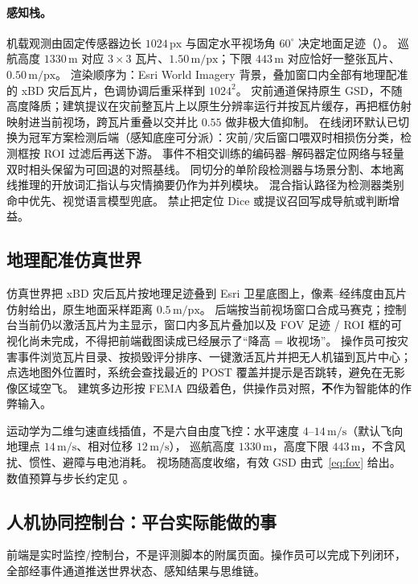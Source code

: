 \paragraph{感知栈。}
机载观测由固定传感器边长 $1024\,\mathrm{px}$ 与固定水平视场角 $60^\circ$ 决定地面足迹（）。
巡航高度 $1330\,\mathrm{m}$ 对应 $3\times3$ 瓦片、$1.50\,\mathrm{m/px}$；下限 $443\,\mathrm{m}$ 对应恰好一整张瓦片、$0.50\,\mathrm{m/px}$。
渲染顺序为：Esri World Imagery 背景，叠加窗口内全部有地理配准的 xBD 灾后瓦片，色调协调后重采样到 $1024^2$。
灾前通道保持原生 GSD，不随高度降质；建筑提议在灾前整瓦片上以原生分辨率运行并按瓦片缓存，再把框仿射映射进当前视场，跨瓦片重叠以交并比 $0.55$ 做非极大值抑制。
在线闭环默认已切换为冠军方案检测后端（感知底座可分派）：灾前/灾后窗口喂双时相损伤分类，检测框按 ROI 过滤后再送下游。
事件不相交训练的编码器--解码器定位网络与轻量双时相头保留为可回退的对照基线。
同切分的单阶段检测器与场景分割、本地离线推理的开放词汇指认与灾情摘要仍作为并列模块。
混合指认路径为检测器类别命中优先、视觉语言模型兜底。
禁止把定位 Dice 或提议召回写成导航或判断增益。

\subsection{地理配准仿真世界}
仿真世界把 xBD 灾后瓦片按地理足迹叠到 Esri 卫星底图上，像素--经纬度由瓦片仿射给出，原生地面采样距离 $0.5\,\mathrm{m/px}$。
后端按当前视场窗口合成马赛克；控制台当前仍以激活瓦片为主显示，窗口内多瓦片叠加以及 FOV 足迹 / ROI 框的可视化尚未完成，不得把前端截图读成已经展示了``降高 = 收视场''。
操作员可按灾害事件浏览瓦片目录、按损毁评分排序、一键激活瓦片并把无人机锚到瓦片中心；
点选地图外位置时，系统会查找最近的 POST 覆盖并提示是否跳转，避免在无影像区域空飞。
建筑多边形按 FEMA 四级着色，供操作员对照，\textbf{不}作为智能体的作弊输入。

运动学为二维匀速直线插值，不是六自由度飞控：水平速度 $4$--$14\,\mathrm{m/s}$（默认飞向地理点 $14\,\mathrm{m/s}$、相对位移 $12\,\mathrm{m/s}$），
巡航高度 $1330\,\mathrm{m}$，高度下限 $443\,\mathrm{m}$，不含风扰、惯性、避障与电池消耗。
视场随高度收缩，有效 GSD 由式~\eqref{eq:fov} 给出。
数值预算与步长约定见 。

\subsection{人机协同控制台：平台实际能做的事}
\label{sec:console}
前端是实时监控/控制台，不是评测脚本的附属页面。操作员可以完成下列闭环，全部经事件通道推送世界状态、感知结果与思维链。

